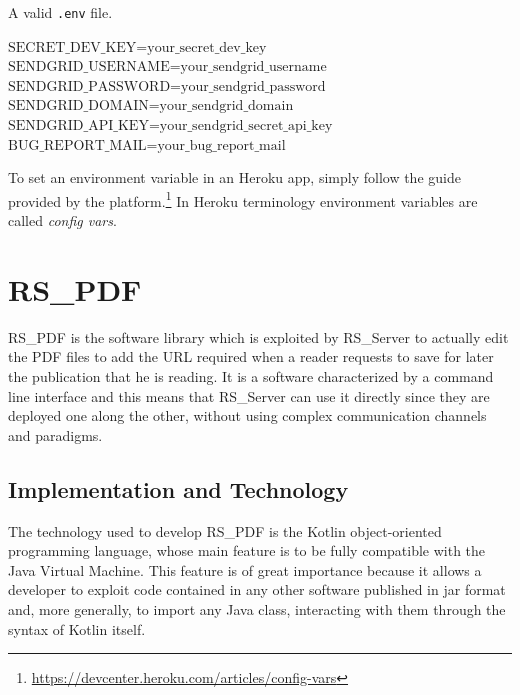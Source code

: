 \documentclass[a4paper, english]{article}
\newcounter{subsubsubsection}[subsubsection]
\begin{document}
\begin{algorithm}[h]
\caption{A valid \texttt{.env} file.}
\label{env-file}
\begin{algorithmic}[1]
\State$\text{SECRET\_DEV\_KEY=your\_secret\_dev\_key}$
\State$\text{SENDGRID\_USERNAME=your\_sendgrid\_username}$
\State$\text{SENDGRID\_PASSWORD=your\_sendgrid\_password}$
\State$\text{SENDGRID\_DOMAIN=your\_sendgrid\_domain}$
\State$\text{SENDGRID\_API\_KEY=your\_sendgrid\_secret\_api\_key}$
\State$\text{BUG\_REPORT\_MAIL=your\_bug\_report\_mail}$
\end{algorithmic}
\end{algorithm}


\label{env-2}

To set an environment variable in an Heroku app, simply follow the guide provided by the platform.\footnote{\url{https://devcenter.heroku.com/articles/config-vars}} In Heroku terminology environment variables are called \emph{config vars}.

\section{RS\_PDF}

\label{rs-pdf}

RS\_PDF \cite{RS-PDF} is the software library which is exploited by RS\_Server to actually edit the PDF files to add the URL required when a reader requests to save for later the publication that he is reading. 
It is a software characterized by a command line interface and this means that RS\_Server can use it directly since they are deployed one along the other, without using complex communication channels and paradigms.    

\subsection{Implementation and Technology}

The technology used to develop RS\_PDF is the Kotlin object-oriented programming language, whose main feature is to be fully compatible with the Java Virtual Machine. This feature is of great importance because it allows a developer to exploit code contained in any other software published in jar format and, more generally, to import any Java class, interacting with them through the syntax of Kotlin itself.
\end{document}
